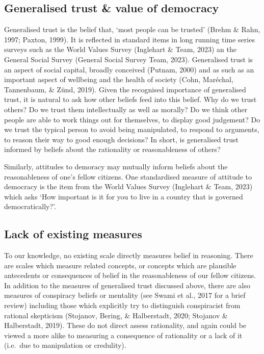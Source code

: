 \documentclass[
  ,jou,floatsintext]{apa6}
\begin{document}
\hypertarget{generalised-trust-value-of-democracy}{%
\subsection{Generalised trust \& value of democracy}\label{generalised-trust-value-of-democracy}}

Generalised trust is the belief that, `most people can be trusted' (Brehm \& Rahn, 1997; Paxton, 1999). It is reflected in standard items in long running time series surveys such as the World Values Survey (Inglehart \& Team, 2023) an the General Social Survey (General Social Survey Team, 2023). Generalised trust is an aspect of social capital, broadly conceived (Putnam, 2000) and as such as an important aspect of wellbeing and the health of society (Cohn, Maréchal, Tannenbaum, \& Zünd, 2019). Given the recognised importance of generalised trust, it is natural to ask how other beliefs feed into this belief. Why do we trust others? Do we trust them intellectually as well as morally? Do we think other people are able to work things out for themselves, to display good judgement? Do we trust the typical person to avoid being manipulated, to respond to arguments, to reason their way to good enough decisions? In short, is generalised trust informed by beliefs about the rationality or reasonableness of others?

Similarly, attitudes to demoracy may mutually inform beliefs about the reasonableness of one's fellow citizens. One standardised measure of attitude to democracy is the item from the World Values Survey (Inglehart \& Team, 2023) which asks `How important is it for you to live in a country that is governed democratically?'.

\hypertarget{lack-of-existing-measures}{%
\subsection{Lack of existing measures}\label{lack-of-existing-measures}}

To our knowledge, no existing scale directly measures belief in reasoning. There are scales which measure related concepts, or concepts which are plausible antecedents or consequences of belief in the reasonableness of our fellow citizens. In addition to the measures of generalised trust discussed above, there are also measures of conspiracy beliefs or mentality (see Swami et al., 2017 for a brief review) including those which explicitly try to distinguish conspiracist from rational skepticism (Stojanov, Bering, \& Halberstadt, 2020; Stojanov \& Halberstadt, 2019). These do not direct assess rationality, and again could be viewed a more alike to measuring a consequence of rationality or a lack of it (i.e.~due to manipulation or credulity).
\end{document}
